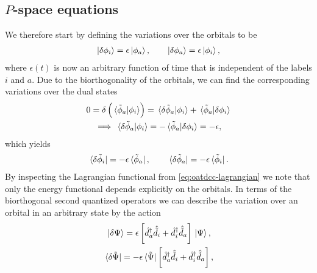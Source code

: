         \subsection{$P$-space equations}
            We therefore start by defining the variations over the orbitals to
            be
            \begin{align}
                \ket{\delta\phi_i} = \epsilon\ket{\phi_a},
                \qquad
                \ket{\delta\phi_a} = \epsilon\ket{\phi_i},
            \end{align}
            where $\epsilon(t)$ is now an arbitrary function of time that is
            independent of the labels $i$ and $a$.
            Due to the biorthogonality of the orbitals, we can find the
            corresponding variations over the dual states
            \begin{gather}
                0 = \delta\left( \braket*{\tilde{\phi}_a}{\phi_i} \right)
                = \braket*{\delta\tilde{\phi}_a}{\phi_i}
                + \braket*{\tilde{\phi}_a}{\delta\phi_i}
                \\
                \implies
                \braket*{\delta\tilde{\phi}_a}{\phi_i}
                = -\braket*{\tilde{\phi}_a}{\delta\phi_i}
                = -\epsilon,
            \end{gather}
            which yields
            \begin{gather}
                \bra*{\delta\tilde{\phi}_i}
                = -\epsilon\bra*{\tilde{\phi}_a},
                \qquad
                \bra*{\delta\tilde{\phi}_a}
                = -\epsilon\bra*{\tilde{\phi}_i}.
            \end{gather}
            By inspecting the Lagrangian functional from
            \autoref{eq:oatdcc-lagrangian} we note that only the energy
            functional depends explicitly on the orbitals.
            In terms of the biorthogonal second quantized operators we can
            describe the variation over an orbital in an arbitrary state by the
            action
            \begin{gather}
                \ket*{\delta\Psi}
                = \epsilon\left[ 
                    \hat{d}^{\dagger}_{a}\hat{\tilde{d}}_{i}
                    + \hat{d}^{\dagger}_{i}\hat{\tilde{d}}_{a}
                 \right]\ket*{\Psi},
                \\
                \bra*{\delta\tilde{\Psi}}
                = -\epsilon\bra*{\tilde{\Psi}}\left[ 
                    \hat{d}^{\dagger}_{a}\hat{\tilde{d}}_{i}
                    + \hat{d}^{\dagger}_{i}\hat{\tilde{d}}_{a}
                 \right],
            \end{gather}
